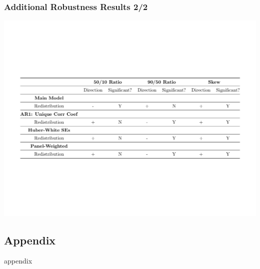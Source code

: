 \documentclass{beamer}
\begin{document}
\begin{frame}
\frametitle{Additional Robustness Results 2/2}
\begin{center}
\includegraphics[scale=0.4]{robustnesscheck3}
\end{center}
\end{frame}

\begin{frame}
\subsection{Appendix}
appendix
\end{frame}
\end{document}
